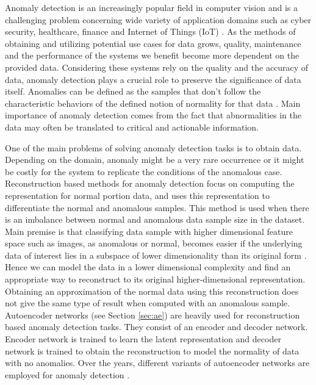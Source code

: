 
\begingroup

Anomaly detection is an increasingly popular field in computer vision and is a challenging 
problem concerning wide variety of application domains such as cyber security, healthcare, 
finance and Internet of Things (IoT) \cite{Chandola:2009:ADS:1541880.1541882}. As the methods of obtaining and 
utilizing potential use cases for data grows, quality, maintenance and the performance of 
the systems we benefit become more dependent on the provided data. Considering these systems 
rely on the quality and the accuracy of data, anomaly detection plays a crucial role to preserve the 
significance of data itself. Anomalies can be defined as the samples that don't follow the 
characteristic behaviors of the defined notion of normality for that data \cite{Chandola07anomalydetection:}. 
Main importance of anomaly detection comes from the fact that abnormalities in the data 
may often be translated to critical and  actionable information. 

One of the main problems of solving anomaly detection tasks is to obtain data. 
Depending on the domain, anomaly might be a very rare occurrence or it might be costly for the 
system to replicate the conditions of the anomalous case. Reconstruction based methods for anomaly 
detection focus on computing the representation for normal portion data, and uses this representation 
to differentiate the normal and anomalous samples. This method is used when there is an imbalance between normal 
and anomalous data sample size in the dataset. Main premise is that classifying data sample with higher dimensional 
feature space such as images, as anomalous or normal, becomes easier if the underlying data of interest 
lies in a subspace of lower dimensionality than its original form \cite{Beyer:1999:NNM:645503.656271}. 
Hence we can model the data in a lower dimensional complexity and find an appropriate way to reconstruct 
to its original higher-dimensional representation. Obtaining an approximation of the normal data using 
this reconstruction does not give the same type of result when computed with an anomalous sample. 
Autoencoder networks (see Section \ref{sec:ae}) are heavily used for reconstruction based anomaly 
detection tasks. They consist of an encoder and decoder network. Encoder 
network is trained to learn the latent representation and decoder network is trained to obtain 
the reconstruction to model the normality of data with no anomalies. Over the years, different 
variants of autoencoder networks are employed for anomaly detection 
\cite{kingma2013autoencoding, Masci2011StackedCA, an2015variational, leveau2017adversarial, Pidhorskyi:2018:GPN:3327757.3327787}.

